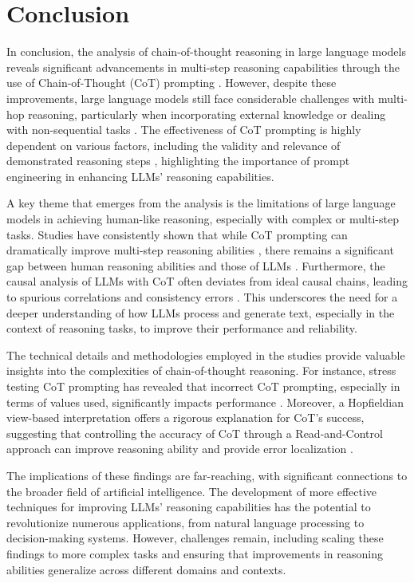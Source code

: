 \documentclass[conference]{IEEEtran}
\begin{document}
\section{Conclusion}
In conclusion, the analysis of chain-of-thought reasoning in large language models reveals significant advancements in multi-step reasoning capabilities through the use of Chain-of-Thought (CoT) prompting \cite{b2}. However, despite these improvements, large language models still face considerable challenges with multi-hop reasoning, particularly when incorporating external knowledge or dealing with non-sequential tasks \cite{b1}. The effectiveness of CoT prompting is highly dependent on various factors, including the validity and relevance of demonstrated reasoning steps \cite{b3}, highlighting the importance of prompt engineering in enhancing LLMs' reasoning capabilities.

A key theme that emerges from the analysis is the limitations of large language models in achieving human-like reasoning, especially with complex or multi-step tasks. Studies have consistently shown that while CoT prompting can dramatically improve multi-step reasoning abilities \cite{b2}, there remains a significant gap between human reasoning abilities and those of LLMs \cite{b3}. Furthermore, the causal analysis of LLMs with CoT often deviates from ideal causal chains, leading to spurious correlations and consistency errors \cite{b4}. This underscores the need for a deeper understanding of how LLMs process and generate text, especially in the context of reasoning tasks, to improve their performance and reliability.

The technical details and methodologies employed in the studies provide valuable insights into the complexities of chain-of-thought reasoning. For instance, stress testing CoT prompting has revealed that incorrect CoT prompting, especially in terms of values used, significantly impacts performance \cite{b5}. Moreover, a Hopfieldian view-based interpretation offers a rigorous explanation for CoT's success, suggesting that controlling the accuracy of CoT through a Read-and-Control approach can improve reasoning ability and provide error localization \cite{b6}.

The implications of these findings are far-reaching, with significant connections to the broader field of artificial intelligence. The development of more effective techniques for improving LLMs' reasoning capabilities has the potential to revolutionize numerous applications, from natural language processing to decision-making systems. However, challenges remain, including scaling these findings to more complex tasks and ensuring that improvements in reasoning abilities generalize across different domains and contexts.
\end{document}
